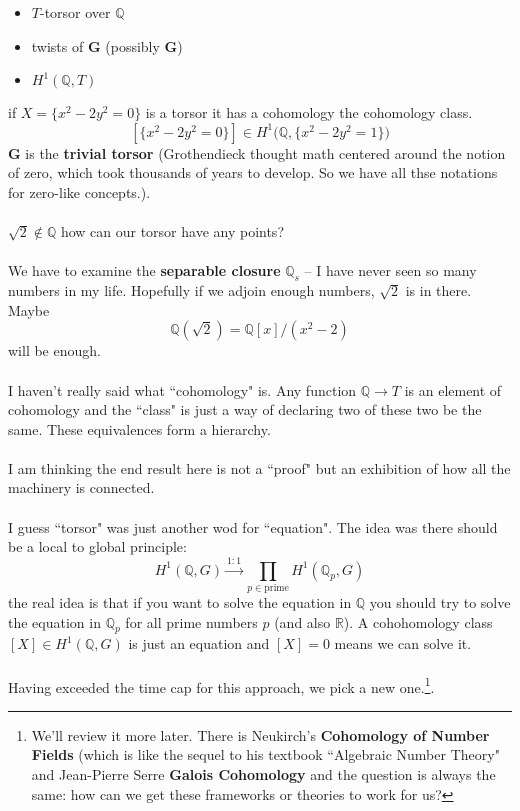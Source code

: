 \documentclass[12pt]{article}
\begin{document}
\begin{itemize}
\item $T$-torsor over $\mathbb{Q}$
\item twists of $\mathbf{G}$ (possibly $\mathbf{G}$)
\item $H^1(\mathbb{Q}, T)$
\end{itemize}
if $X = \{ x^2 - 2y^2 = 0 \}$ is a torsor it has a cohomology the cohomology class. $$[\{ x^2 - 2y^2 = 0 \}] \in H^1 \big(\mathbb{Q}, \{ x^2 - 2y^2 = 1\} \big)$$ 
$\mathbf{G}$ is the \textbf{trivial torsor}  (Grothendieck thought math centered around the notion of zero, which took thousands of years to develop.  So we have all thse notations for zero-like concepts.). \\ \\
$\sqrt{2} \notin \mathbb{Q}$ how can our torsor have any points? \\ \\
We have to examine the \textbf{separable closure} $\mathbb{Q}_s$ -- I have never seen so many numbers in my life.  Hopefully if we adjoin enough numbers, $\sqrt{2}$ is in there.  Maybe
$$ \mathbb{Q}(\sqrt{2}) = \mathbb{Q}[x]/(x^2 - 2) $$
will be enough. \\ \\
I haven't really said what ``cohomology" is.  Any function $\mathbb{Q} \to T$ is an element of cohomology and the ``class" is just a way of declaring two of these two be the same.  These equivalences form a hierarchy. \\ \\
I am thinking the end result here is not a ``proof" but an exhibition of how all the machinery is connected. \\ \\ 
I guess ``torsor" was just another wod for ``equation".  The idea was there should be a local to global principle:
$$ H^1(\mathbb{Q}, G) \stackrel{1:1}{\longrightarrow} \prod_{p \in \text{prime}} H^1(\mathbb{Q}_p, G) $$
the real idea is that if you want to solve the equation in $\mathbb{Q}$ you should try to solve the equation in $\mathbb{Q}_p$ for all prime numbers $p$ (and also $\mathbb{R}$). A cohohomology class $[X] \in H^1(\mathbb{Q}, G)$ is just an equation and $[X]=0$ means we can solve it.
\\ \\
\noindent Having exceeded the time cap for this approach, we pick a new one.\footnote{We'll review it more later.  There is Neukirch's \textbf{Cohomology of Number Fields} (which is like the sequel to his textbook ``Algebraic Number Theory" and Jean-Pierre Serre \textbf{Galois Cohomology} and the question is always the same: how can we get these frameworks or theories to work for us? }.
\end{document}
